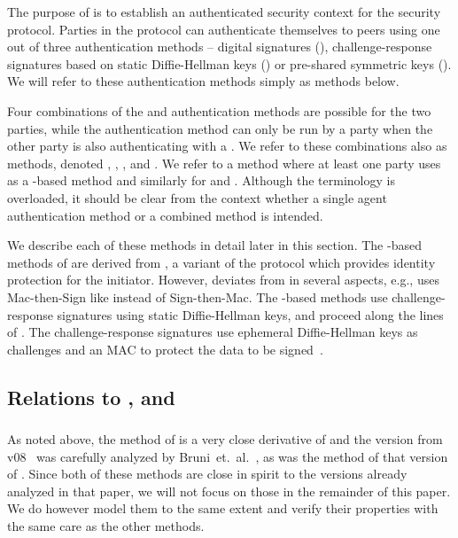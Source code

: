 The purpose of \mEdhoc{} is to establish an authenticated security context
for the \mOscore{} security protocol.
Parties in the \mEdhoc{} protocol can authenticate
themselves to peers using one out of three authentication methods -- digital
signatures
(\mSig), challenge-response signatures based on static Diffie-Hellman keys
(\mStat) or pre-shared symmetric keys (\mPsk).
We will refer to these authentication methods simply as methods below.

Four combinations of the \mSig{} and \mStat{} authentication methods are possible for the two parties, while the \mPsk{} authentication method can only be run by {a party when the other party is} also authenticating with a \mPsk. We refer to these combinations also as methods, denoted \mSigSig, \mSigStat, \mStatStat, \mStatSig{} and \mPskPsk. {We refer to a method where at least one party uses \mSig{} as a \mSig-based method and similarly for \mStat{} and \mPsk.}
Although the terminology is overloaded, it should be clear from the context whether a single agent authentication method or a combined method is intended.

We describe each of these methods in detail later in this section.
The \mSig-based methods of \mEdhoc{} {are derived from} \mSigmaI, a variant of the \mSigma{} protocol which provides identity protection for the initiator. However, \mEdhoc{} deviates from \mSigmaI{} in several aspects, e.g., \mEdhoc{} uses Mac-then-Sign like \mTls{} instead of Sign-then-Mac. The \mStat-based methods use challenge-response signatures using static Diffie-Hellman keys, and proceed along the lines of \mOptls. The challenge-response signatures use ephemeral Diffie-Hellman keys as challenges and an \mAead{} MAC to protect the data to be signed~\cite{aead,rfc5116,DBLP:conf/eurosp/KrawczykW16}.


\subsection{Relations to \mSigma, \mOptls{} and \mNoise{}}
\subsubsection{\mSigma{}}
As noted above, the \mSigSig{} method of \mEdhoc{} is a very close
derivative of \mSigmaI{} and the version from \mEdhoc{}
v08~\cite{selander-ace-cose-ecdhe-08} was carefully analyzed by
Bruni~et.~al.~\cite{DBLP:conf/secsr/BruniJPS18}, as was the \mPskPsk{} method of
that version of \mEdhoc{}. Since both of these methods are close in spirit to
the versions already analyzed in that paper, we will not focus on those in the
remainder of this paper. We do however model them to the same extent and
verify their properties with the same care as the other methods.

